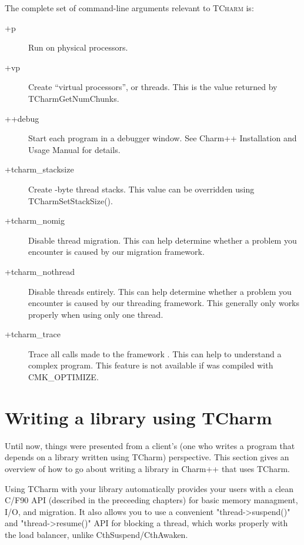\documentclass[10pt]{article}
\newcommand{\tcharm}{\textsc{TCharm}}
\begin{document}
The complete set of command-line arguments relevant to \tcharm{} is:

\begin{description}
\item[+p ] Run on  physical processors.

\item[+vp ] Create  ``virtual processors'', or threads.  This is
the value returned by TCharmGetNumChunks.

\item[++debug] Start each program in a debugger window.  See Charm++
Installation and Usage Manual for details.

\item[+tcharm\_stacksize ] Create -byte thread stacks.  This
value can be overridden using TCharmSetStackSize().

\item[+tcharm\_nomig] Disable thread migration.  This can help determine
whether a problem you encounter is caused by our migration framework.

\item[+tcharm\_nothread] Disable threads entirely.  This can help determine
whether a problem you encounter is caused by our threading framework.
This generally only works properly when using only one thread.

\item[+tcharm\_trace ] Trace all calls made to the framework .
This can help to understand a complex program.  This feature is not
available if \charmpp{} was compiled with CMK\_OPTIMIZE.

\end{description}

\section{Writing a library using TCharm}
\label{sec:tlib}

Until now, things were presented from a client's (one who writes a program that
depends on a library written using TCharm) perspective. This section gives an
overview of how to go about writing a library in Charm++ that uses TCharm.

Using TCharm with your library automatically provides your users with a 
clean C/F90 API (described in the preceeding chapters) for basic memory 
managment, I/O, and migration.  It also allows you to use a convenient
"thread->suspend()" and "thread->resume()" API for blocking a thread,
which works properly with the load balancer, unlike CthSuspend/CthAwaken.
\end{document}
